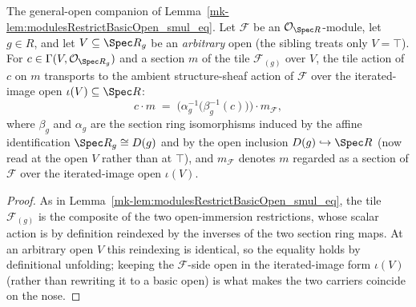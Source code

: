 \begin{lemma}\label{mk-lem:modulesRestrictBasicOpen_smul_eq_genV}
  \leanok

  The general-open companion of Lemma~\ref{mk-lem:modulesRestrictBasicOpen_smul_eq}. Let \(\mathcal{F}\)
  be an \(\mathcal{O}_{\Spec R}\)-module, let \(g \in R\), and let \(V \subseteq \Spec R_g\) be an
  \emph{arbitrary} open (the sibling treats only \(V = \top\)). For \(c \in \Gamma(V,
  \mathcal{O}_{\Spec R_g})\) and a section \(m\) of the tile \(\mathcal{F}_{(g)}\) over \(V\), the tile
  action of \(c\) on \(m\) transports to the ambient structure-sheaf action of \(\mathcal{F}\) over the
  iterated-image open \(\iota(V) \subseteq \Spec R\):
  \[
    c \cdot m \;=\; \bigl(\alpha_g^{-1}\bigl(\beta_g^{-1}(c)\bigr)\bigr) \cdot m_{\mathcal{F}},
  \]
  where \(\beta_g\) and \(\alpha_g\) are the section ring isomorphisms induced by the affine
  identification \(\Spec R_g \cong D(g)\) and by the open inclusion \(D(g) \hookrightarrow \Spec R\)
  (now read at the open \(V\) rather than at \(\top\)), and \(m_{\mathcal{F}}\) denotes \(m\) regarded
  as a section of \(\mathcal{F}\) over the iterated-image open \(\iota(V)\).
\end{lemma}
\begin{proof}
  \leanok
  As in Lemma~\ref{mk-lem:modulesRestrictBasicOpen_smul_eq}, the tile \(\mathcal{F}_{(g)}\) is the
  composite of the two open-immersion restrictions, whose scalar action is by definition reindexed by
  the inverses of the two section ring maps. At an arbitrary open \(V\) this reindexing is identical, so
  the equality holds by definitional unfolding; keeping the \(\mathcal{F}\)-side open in the
  iterated-image form \(\iota(V)\) (rather than rewriting it to a basic open) is what makes the two
  carriers coincide on the nose.
\end{proof}

